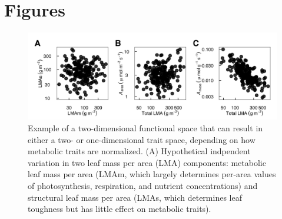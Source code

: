 \documentclass[
  12pt,
]{article}
\providecommand{\DIFaddbeginFL}{} %
\providecommand{\DIFdelbeginFL}{} %
\providecommand{\DIFdelendFL}{} %
\newcommand{\DIFscaledelfig}{0.5}
\newlength{\DIFdelgraphicswidth} %
\newlength{\DIFdelgraphicsheight} %
\newcommand{\DIFaddincludegraphics}[2][]{{\color{blue}\fbox{\DIFOincludegraphics[#1]{#2}}}} %
\newcommand{\DIFdelincludegraphics}[2][]{%
\sbox{\DIFdelgraphicsbox}{\DIFOincludegraphics[#1]{#2}}%
\settoboxwidth{\DIFdelgraphicswidth}{\DIFdelgraphicsbox} %
\settoboxtotalheight{\DIFdelgraphicsheight}{\DIFdelgraphicsbox} %
\scalebox{\DIFscaledelfig}{%
\parbox[b]{\DIFdelgraphicswidth}{\usebox{\DIFdelgraphicsbox}\\[-\baselineskip] \rule{\DIFdelgraphicswidth}{0em}}\llap{\resizebox{\DIFdelgraphicswidth}{\DIFdelgraphicsheight}{%
\setlength{\unitlength}{\DIFdelgraphicswidth}%
\begin{picture}(1,1)%
\thicklines\linethickness{2pt} %
{\color[rgb]{1,0,0}\put(0,0){\framebox(1,1){}}}%
{\color[rgb]{1,0,0}\put(0,0){\line( 1,1){1}}}%
{\color[rgb]{1,0,0}\put(0,1){\line(1,-1){1}}}%
\end{picture}%
}\hspace*{3pt}}} %
} %
\DeclareRobustCommand{\DIFaddbeginFL}{\DIFOaddbeginFL \let\includegraphics\DIFaddincludegraphics} %
\DeclareRobustCommand{\DIFdelbeginFL}{\DIFOdelbeginFL \let\includegraphics\DIFdelincludegraphics} %
\DeclareRobustCommand{\DIFdelendFL}{\DIFOaddendFL \let\includegraphics\DIFOincludegraphics} %
\begin{document}
\newpage

\hypertarget{figures}{%
\section{Figures}\label{figures}}

\begin{figure}
\DIFdelbeginFL %
\DIFdelendFL \DIFaddbeginFL \hypertarget{fig:Hplt}{%
\centering
\includegraphics{../figs/fig_h3.png}
\caption{Example of a two-dimensional functional space that can result in either a two- or one-dimensional trait space, depending on how metabolic traits are normalized. (A) Hypothetical indpendent variation in two leaf mass per area (LMA) components: metabolic leaf mass per area (LMAm, which largely determines per-area values of photosynthesis, respiration, and nutrient concentrations) and structural leaf mass per area (LMAs, which determines leaf toughness but has little effect on metabolic traits).
}}
\end{figure}
\end{document}
